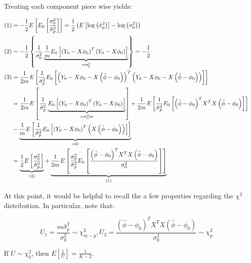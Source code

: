 \documentclass[]{book}
\theoremstyle{definition}
\theoremstyle{definition}
\theoremstyle{definition}
\theoremstyle{remark}
\begin{document}
{Treating each component piece wise yields:

\begin{align*}
  \left( 1 \right) &=  - \frac{1}{2}E\left[ {{E_0}\left[ {\frac{{\sigma _0^2}}{{\hat \sigma _p^2}}} \right]} \right] = \frac{1}{2}\left( {E\left[ {\log \left( {\hat \sigma _p^2} \right)} \right] - \log \left( {\sigma _0^2} \right)} \right) \hfill \\
  \left( 2 \right) &=  - \frac{1}{2}\left\{ {\frac{1}{{\sigma _0^2}}\underbrace {\frac{1}{m}{E_0}\left[ {{{\left( {{Y_0} - X{\phi _0}} \right)}^T}\left( {{Y_0} - X{\phi _0}} \right)} \right]}_{ = \sigma _0^2}} \right\} =  - \frac{1}{2} \hfill \\
  \left( 3 \right) &= \frac{1}{{2m}}E\left[ {\frac{1}{{\hat \sigma _p^2}}{E_0}\left[ {{{\left( {{Y_0} - X{\phi _0} - X\left( {\hat \phi  - {\phi _0}} \right)} \right)}^T}\left( {{Y_0} - X{\phi _0} - X\left( {\hat \phi  - {\phi _0}} \right)} \right)} \right]} \right] \hfill \\
   &= \frac{1}{{2m}}E\left[ {\frac{1}{{\hat \sigma _p^2}}\underbrace {{E_0}\left[ {{{\left( {{Y_0} - X{\phi _0}} \right)}^T}\left( {{Y_0} - X{\phi _0}} \right)} \right]}_{ = \sigma _0^2m}} \right] + \frac{1}{{2m}}E\left[ {\frac{1}{{\hat \sigma _p^2}}{E_0}\left[ {{{\left( {\hat \phi  - {\phi _0}} \right)}^T}{X^T}X\left( {\hat \phi  - {\phi _0}} \right)} \right]} \right] \hfill \\
   &- \underbrace {\frac{1}{m}E\left[ {\frac{1}{{\hat \sigma _p^2}}{E_0}\left[ {{{\left( {{Y_0} - X{\phi _0}} \right)}^T}\left( {X\left( {\hat \phi  - {\phi _0}} \right)} \right)} \right]} \right]}_{ = 0} \hfill \\
   &= \underbrace {\frac{1}{2}E\left[ {\frac{{\sigma _0^2}}{{\hat \sigma _p^2}}} \right]}_{\left( 4 \right)} + \underbrace {\frac{1}{{2m}}E\left[ {\frac{{\sigma _0^2}}{{\hat \sigma _p^2}}{E_0}\left[ {\frac{{{{\left( {\hat \phi  - {\phi _0}} \right)}^T}{X^T}X\left( {\hat \phi  - {\phi _0}} \right)}}{{\sigma _0^2}}} \right]} \right]}_{\left( 5 \right)}
\end{align*}

At this point, it would be helpful to recall the a few properties
regarding the \(\chi^2\) distribution. In particular, note that:

\[{U_1} = \frac{{m\hat \sigma _p^2}}{{\sigma _0^2}} \sim \chi _{m - p}^2 , 
  {U_2} = \frac{{{{\left( {\hat \phi  - {\phi _0}} \right)}^T}{X^T}X\left( {\hat \phi  - {\phi _0}} \right)}}{{\sigma _0^2}} \sim \chi _p^2 \]

If \(U \sim \chi _k^2\), then
\(E\left[ {\frac{1}{U}} \right] = \frac{1}{{K - 2}}\).

}
\end{document}
